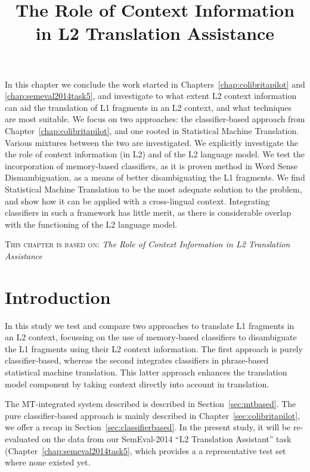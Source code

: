 

\title{The Role of Context Information in L2 Translation Assistance}



In this chapter we conclude the work started in
Chapters~\ref{chap:colibritapilot} and \ref{chap:semeval2014task5}, and
investigate to what extent L2 context information can aid the translation of L1
fragments in an L2 context, and what techniques are most suitable. We focus on
two approaches: the classifier-based approach from
Chapter~\ref{chap:colibritapilot}, and one rooted in Statistical
Machine Translation.  Various mixtures between the two are investigated. We
explicitly investigate the the role of context information (in L2) and of the
L2 language model. We test the incorporation of memory-based classifiers, as it
is proven method in Word Sense Dismambiguation, as a means of better
disambiguating the L1 fragments.  We find Statistical Machine Translation to be
the most adequate solution to the problem, and show how it can be applied with
a cross-lingual context. Integrating classifiers in such a framework has
little merit, as there is considerable overlap with the functioning of the L2
language model.

\textsc{This chapter is based on: } \emph{The Role of Context Information in L2 Translation Assistance}

  
\section{Introduction}

In this study we test and compare two approaches to translate L1 fragments in
an L2 context, focussing on the use of memory-based classifiers to disambiguate
the L1 fragments using their L2 context information. The first approach is
purely classifier-based, whereas the second integrates classifiers in
phrase-based statistical machine translation. This latter approach enhances the
translation model component by taking context directly into account in
translation. 

The MT-integrated system described is described in Section~\ref{sec:mtbased}.
The pure classifier-based approach is mainly described in
Chapter~\ref{sec:colibritapilot}, we offer a recap in
Section~\ref{sec:classifierbased}. In the present study, it will be re-evaluated on the
data from our SemEval-2014 ``L2 Translation Assistant'' task
(Chapter~\ref{chap:semeval2014task5}, which provides a
a representative test set where none existed yet.

